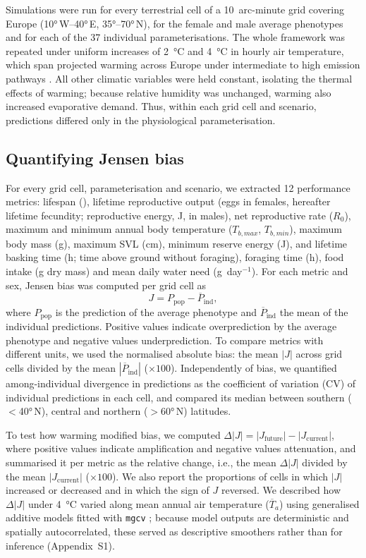 \documentclass[12pt]{article}
\begin{document}
Simulations were run for every terrestrial cell of a 10~arc-minute grid covering Europe (\ang{10}\,W--\ang{40}\,E, \ang{35}--\ang{70}\,N), for the female and male average phenotypes and for each of the 37 individual parameterisations. The whole framework was repeated under uniform increases of \qty{+2}{\celsius} and \qty{+4}{\celsius} in hourly air temperature, which span projected warming across Europe under intermediate to high emission pathways \parencite{calvin2023}. All other climatic variables were held constant, isolating the thermal effects of warming; because relative humidity was unchanged, warming also increased evaporative demand. Thus, within each grid cell and scenario, predictions differed only in the physiological parameterisation.

\subsection{Quantifying Jensen bias}

For every grid cell, parameterisation and scenario, we extracted 12 performance metrics: lifespan (\si{\year}), lifetime reproductive output (eggs in females, hereafter lifetime fecundity; reproductive energy, \si{\joule}, in males), net reproductive rate ($R_0$), maximum and minimum annual body temperature ($T_{b,max}$, $T_{b,min}$), maximum body mass (\si{\g}), maximum SVL (\si{\cm}), minimum reserve energy (\si{\joule}), and lifetime basking time (\si{\hour}; time above ground without foraging), foraging time (\si{\hour}), food intake (\si{\g} dry mass) and mean daily water need (g~day$^{-1}$). For each metric and sex, Jensen bias was computed per grid cell as
\[
J=P_{\mathrm{pop}}-\overline{P}_{\mathrm{ind}},
\]
where $P_{\mathrm{pop}}$ is the prediction of the average phenotype and $\overline{P}_{\mathrm{ind}}$ the mean of the individual predictions. Positive values indicate overprediction by the average phenotype and negative values underprediction. To compare metrics with different units, we used the normalised absolute bias: the mean $|J|$ across grid cells divided by the mean $|\overline{P}_{\mathrm{ind}}|$ ($\times 100$). Independently of bias, we quantified among-individual divergence in predictions as the coefficient of variation (CV) of individual predictions in each cell, and compared its median between southern ($<$\ang{40}\,N), central and northern ($>$\ang{60}\,N) latitudes.

To test how warming modified bias, we computed $\Delta |J|=|J_{\mathrm{future}}|-|J_{\mathrm{current}}|$, where positive values indicate amplification and negative values attenuation, and summarised it per metric as the relative change, i.e., the mean $\Delta|J|$ divided by the mean $|J_{\mathrm{current}}|$ ($\times 100$). We also report the proportions of cells in which $|J|$ increased or decreased and in which the sign of $J$ reversed. We described how $\Delta|J|$ under \qty{+4}{\celsius} varied along mean annual air temperature ($\overline{T}_a$) using generalised additive models fitted with \texttt{mgcv} \parencite{R-mgcv}; because model outputs are deterministic and spatially autocorrelated, these served as descriptive smoothers rather than for inference (Appendix~S1).
\end{document}
